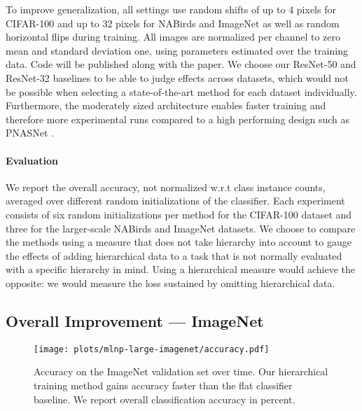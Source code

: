 \documentclass[10pt,twocolumn,letterpaper]{article}
\begin{document}
To improve generalization, all settings use random shifts of up to 4 pixels for CIFAR-100 and
up to 32 pixels for NABirds and ImageNet as well as random horizontal flips during training. All images
are normalized per channel to zero mean and standard deviation one, using parameters estimated over the
training data. Code will be published along with the paper.
We choose our ResNet-50 and ResNet-32 baselines to be able to judge effects across datasets, which would not be possible
when selecting a state-of-the-art method for each dataset individually. Furthermore, the moderately sized
architecture enables faster training and therefore more experimental runs compared to a high performing
design such as PNASNet \cite{Liu2017PNASNet}.

\paragraph{Evaluation}
We report the overall accuracy, not normalized w.r.t class instance counts,
averaged over different random initializations of the classifier.
Each experiment consists of six random initializations per method for the CIFAR-100
dataset and three for the larger-scale NABirds and ImageNet datasets.
We choose to compare the methods using a measure that does not
take hierarchy into account to gauge the effects of adding hierarchical data to a task
that is not normally evaluated with a specific hierarchy in mind. Using a hierarchical measure would
achieve the opposite: we would measure the loss sustained by omitting hierarchical data.

\subsection{Overall Improvement --- ImageNet}
\label{sec:exp-in}
\label{sec:exp-first}

\begin{figure}
\centering
\texttt{[image: plots/mlnp-large-imagenet/accuracy.pdf]}
\caption{Accuracy on the ImageNet validation set over time. Our hierarchical training method gains accuracy faster than the
flat classifier baseline. We report overall classification accuracy in percent.}
\label{fig:expingraph}
\end{figure}
\end{document}
